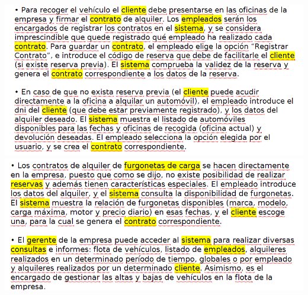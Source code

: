 \documentclass{article}
\begin{document}
{\begin{flushleft}
\begin{itemize}
\includegraphics[width=16cm]{img/parteB3} \hspace{0.5cm}
\includegraphics[width=16cm]{img/parteB4} \hspace{0.5cm}


\end{itemize}
\end{flushleft}}
\end{document}
